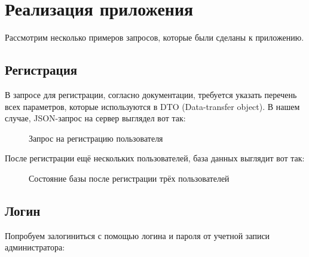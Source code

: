 \documentclass[coursework]{SCWorks}
\begin{document}
\section{Реализация приложения}

Рассмотрим несколько примеров запросов, которые были сделаны к приложению.

\subsection{Регистрация}

В запросе для регистрации, согласно документации, требуется указать перечень
всех параметров, которые используются в DTO (Data-transfer object). В нашем
случае, JSON-запрос на сервер выглядел вот так:

\begin{figure}[H]
	\caption{Запрос на регистрацию пользователя}
	\label{pic3}
\end{figure}

После регистрации ещё нескольких пользователей, база данных выглядит вот так:

\begin{figure}[H]
	\caption{Состояние базы после регистрации трёх пользователей}
	\label{pic4}
\end{figure}

\subsection{Логин}

Попробуем залогиниться с помощью логина и пароля от учетной записи 
администратора:
\end{document}

